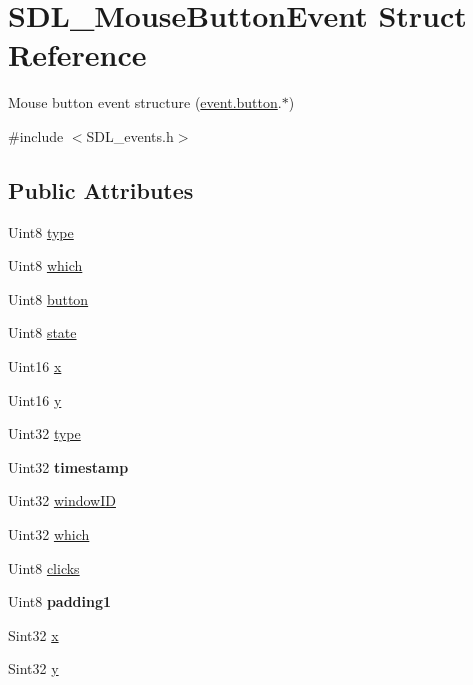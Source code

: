 \hypertarget{structSDL__MouseButtonEvent}{\section{S\+D\+L\+\_\+\+Mouse\+Button\+Event Struct Reference}
\label{structSDL__MouseButtonEvent}
}


Mouse button event structure (\hyperlink{unionSDL__Event_ab6da2fa2687e5f849f270adecc64785f}{event.\+button}.$\ast$)  




{\ttfamily \#include $<$S\+D\+L\+\_\+events.\+h$>$}

\subsection*{Public Attributes}
\begin{DoxyCompactItemize}
\item 
Uint8 \hyperlink{structSDL__MouseButtonEvent_af64cb09ea68b8081ecc8ee498552e3d7}{type}
\item 
Uint8 \hyperlink{structSDL__MouseButtonEvent_a366aef59a0f393afc8a3561e741825df}{which}
\item 
Uint8 \hyperlink{structSDL__MouseButtonEvent_a1a4680e19ae06d02d2093f0bcba1b24c}{button}
\item 
Uint8 \hyperlink{structSDL__MouseButtonEvent_a8809cef85cfffad4f2059f2ba4fc6a3d}{state}
\item 
Uint16 \hyperlink{structSDL__MouseButtonEvent_a5bb9c61b86e999f58637511e32e3a076}{x}
\item 
Uint16 \hyperlink{structSDL__MouseButtonEvent_a7ccb5c55a7ddadce723f4ea6d5269540}{y}
\item 
Uint32 \hyperlink{structSDL__MouseButtonEvent_af64cb09ea68b8081ecc8ee498552e3d7}{type}
\item 
\hypertarget{structSDL__MouseButtonEvent_ab05e8a454692608ff56c502e95799c56}{Uint32 {\bfseries timestamp}}\label{structSDL__MouseButtonEvent_ab05e8a454692608ff56c502e95799c56}

\item 
Uint32 \hyperlink{structSDL__MouseButtonEvent_ab3b855d4b543b5d02fcf5d56e4421393}{window\+I\+D}
\item 
Uint32 \hyperlink{structSDL__MouseButtonEvent_a366aef59a0f393afc8a3561e741825df}{which}
\item 
Uint8 \hyperlink{structSDL__MouseButtonEvent_aa606bebcbc3ffc7e932016039c2a36a1}{clicks}
\item 
\hypertarget{structSDL__MouseButtonEvent_a765957d218d16fa00558fa4d20e80689}{Uint8 {\bfseries padding1}}\label{structSDL__MouseButtonEvent_a765957d218d16fa00558fa4d20e80689}

\item 
Sint32 \hyperlink{structSDL__MouseButtonEvent_a5bb9c61b86e999f58637511e32e3a076}{x}
\item 
Sint32 \hyperlink{structSDL__MouseButtonEvent_a7ccb5c55a7ddadce723f4ea6d5269540}{y}
\end{DoxyCompactItemize}


